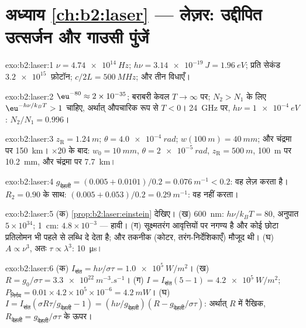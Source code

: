 \section*{अध्याय \ref{ch:b2:laser} --- लेज़र: उद्दीपित उत्सर्जन और गाउसी पुंजें}

\begin{solution}{exo:b2:laser:1}
$\nu = \qty{4.74e14}{Hz}$; $h\nu = \qty{3.14e-19}{J} = \qty{1.96}{eV}$;
प्रति सेकंड $\qty{3.2e15}{}$ फ़ोटॉन; $c/2L = \qty{500}{MHz}$; और तीन
विधाएँ।
\end{solution}

\begin{solution}{exo:b2:laser:2}
$\eu^{-80} \approx 2 \times 10^{-35}$; बराबरी केवल $T \to \infty$ पर;
$N_2 > N_1$ के लिए $\eu^{-h\nu/k_BT} > 1$ चाहिए, अर्थात् औपचारिक रूप से $T < 0$।
\qty{24}{GHz} पर, $h\nu = \qty{1e-4}{eV}$: $N_2/N_1 = 0.996$।
\end{solution}

\begin{solution}{exo:b2:laser:3}
$z_{\text{R}} = \qty{1.24}{m}$; $\theta = \qty{4.0e-4}{rad}$; $w(\qty{100}{m}) =
\qty{40}{mm}$; और चंद्रमा पर \qty{150}{km}। $\times 20$ के बाद: $w_0 = \qty{10}{mm}$,
$\theta = \qty{2e-5}{rad}$, $z_{\text{R}} = \qty{500}{m}$, \qty{100}{m} पर \qty{10.2}{mm},
और चंद्रमा पर \qty{7.7}{km}।
\end{solution}

\begin{solution}{exo:b2:laser:4}
$g_{\text{देहली}} = (0.005 + 0.0101)/0.2 = \qty{0.076}{m^{-1}} < 0.2$: वह
लेज़ करता है। $R_2 = 0.90$ के साथ: $(0.005 + 0.053)/0.2 = \qty{0.29}{m^{-1}}$: वह
नहीं करता।
\end{solution}

\begin{solution}{exo:b2:laser:5}
(क) \cref{prop:b2:laser:einstein} देखिए। (ख) \qty{600}{nm}: $h\nu/k_BT
= 80$, अनुपात $5 \times 10^{34}$; \qty{1}{cm}: $4.8 \times 10^{-3}$ ---
 हावी। (ग) सूक्ष्मतरंग आवृत्तियों पर
 नगण्य है और कोई छोटा प्रतिलोमन भी पहले से लब्धि दे
देता है; और तकनीक (कोटर, तरंग-निर्देशिकाएँ) मौजूद थी। (घ) $A \propto
\nu^3$, अतः $\tau \propto \lambda^3$: \qty{10}{\micro s}।
\end{solution}

\begin{solution}{exo:b2:laser:6}
(क) $I_{\text{संत}} = h\nu/\sigma\tau = \qty{1.0e5}{W/m^2}$। (ख) $R =
g_0/\sigma\tau = \qty{3.3e22}{m^{-3}.s^{-1}}$। (ग) $I = I_{\text{संत}}(5 - 1) =
\qty{4.2e5}{W/m^2}$; $P_{\text{निर्गम}} = 0.01 \times 4.2 \times 10^5 \times
10^{-6} = \qty{4.2}{mW}$। (घ) $I = I_{\text{संत}}(\sigma R\tau/g_{\text{देहली}}
- 1) = (h\nu/g_{\text{देहली}})(R - g_{\text{देहली}}/\sigma\tau)$: अर्थात् $R$ में रैखिक,
$R_{\text{देहली}} = g_{\text{देहली}}/\sigma\tau$ के ऊपर।
\end{solution}

